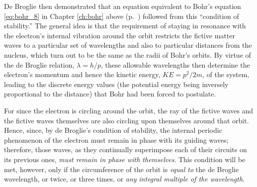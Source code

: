 De Broglie then demonstrated that an equation equivalent to Bohr's
equation \eqref{eq:bohr_8} in Chapter \ref{ch:bohr} above (p.~\pageref{eq:bohr_8})
followed from this ``condition of
stability.'' The general idea is that the requirement of staying in
resonance with the electron's internal vibration around the orbit
restricts the fictive matter waves to a particular set of wavelengths
and also to particular distances from the nucleus, which turn out to be
the same as the radii of Bohr's orbits. By virtue of the de Broglie
relation, $\lambda = h/p$, these allowable wavelengths then
determine the electron's momentum and hence the kinetic energy,
$KE = p^2/2m$, of the system,
leading to the discrete energy values (the potential energy being
inversely proportional to the distance) that Bohr had been forced to
postulate.

For since the electron is circling around the orbit, the ray of the
fictive waves and the fictive waves themselves are also circling upon
themselves around that orbit. Hence, since, by de Broglie's condition of
stability, the internal periodic phenomenon of the electron must remain
in phase with its guiding waves; therefore, those waves, as they
continually superimpose each of their circuits on its previous ones,
\emph{must remain in phase with themselves}. This condition will be met,
however, only if the circumference of the orbit is \emph{equal to} the
de Broglie wavelength, or twice, or three times, or \emph{any}
\emph{integral multiple of the wavelength}.

